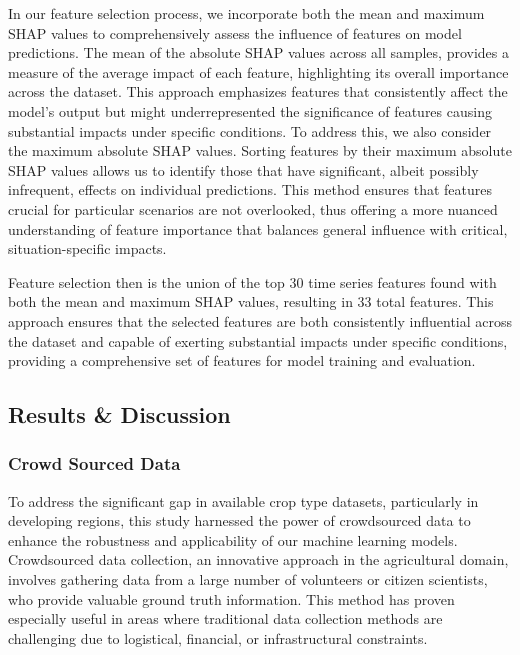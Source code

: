 \documentclass[
]{article}
\begin{document}
In our feature selection process, we incorporate both the mean and
maximum SHAP values to comprehensively assess the influence of features
on model predictions. The mean of the absolute SHAP values across all
samples, provides a measure of the average impact of each feature,
highlighting its overall importance across the dataset. This approach
emphasizes features that consistently affect the model's output but
might underrepresented the significance of features causing substantial
impacts under specific conditions. To address this, we also consider the
maximum absolute SHAP values. Sorting features by their maximum absolute
SHAP values allows us to identify those that have significant, albeit
possibly infrequent, effects on individual predictions. This method
ensures that features crucial for particular scenarios are not
overlooked, thus offering a more nuanced understanding of feature
importance that balances general influence with critical,
situation-specific impacts.

Feature selection then is the union of the top 30 time series features
found with both the mean and maximum SHAP values, resulting in 33 total
features. This approach ensures that the selected features are both
consistently influential across the dataset and capable of exerting
substantial impacts under specific conditions, providing a comprehensive
set of features for model training and evaluation.

\hypertarget{results-discussion}{%
\subsection{Results \& Discussion}\label{results-discussion}}

\hypertarget{crowd-sourced-data}{%
\subsubsection{Crowd Sourced Data}\label{crowd-sourced-data}}

To address the significant gap in available crop type datasets,
particularly in developing regions, this study harnessed the power of
crowdsourced data to enhance the robustness and applicability of our
machine learning models. Crowdsourced data collection, an innovative
approach in the agricultural domain, involves gathering data from a
large number of volunteers or citizen scientists, who provide valuable
ground truth information. This method has proven especially useful in
areas where traditional data collection methods are challenging due to
logistical, financial, or infrastructural constraints.
\end{document}
